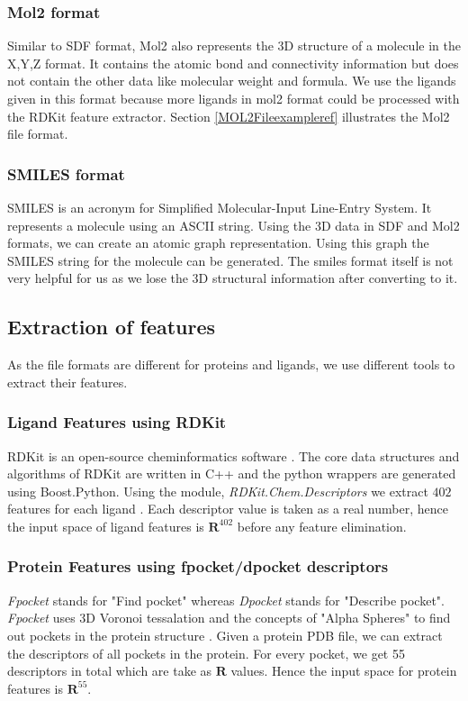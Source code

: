 \documentclass[11pt]{article}
\begin{document}
\subsubsection{Mol2 format}
Similar to SDF format,  Mol2 also represents the 3D structure of a molecule in the X,Y,Z format.
It contains the atomic bond and connectivity information but does not contain the other data like molecular weight and formula.
We use the ligands given in this format because more ligands in mol2 format could be processed with the RDKit feature extractor.
Section \ref{MOL2Fileexampleref} illustrates the Mol2 file format.

\subsubsection{SMILES format}
SMILES is an acronym for Simplified Molecular-Input Line-Entry System.
It represents a molecule using an ASCII string.
Using the 3D data in SDF and Mol2 formats,  we can create an atomic graph representation.
Using this graph the SMILES string for the molecule can be generated.
The smiles format itself is not very helpful for us as we lose the 3D structural information after converting to it.
\cite{smilesformat}

\subsection{Extraction of features}
As the file formats are different for proteins and ligands,  we use different tools to extract their features.
\subsubsection{Ligand Features using RDKit}
RDKit is an open-source cheminformatics software \cite{rdkitofficalpage}.
The core data structures and algorithms of RDKit are written in C++ and the
python wrappers are generated using Boost.Python.
Using the module, \textit{RDKit.Chem.Descriptors} we extract $402$ features for each ligand \cite{rdkitbioinformaticsfreiburg}.
Each descriptor value is taken as a real number,  hence the input space of ligand features is $\mathbf{R}^{402}$ before any feature elimination.

\subsubsection{Protein Features using fpocket/dpocket descriptors}
\textit{Fpocket} stands for "Find pocket" whereas \textit{Dpocket} stands for "Describe pocket".
\textit{Fpocket} uses 3D Voronoi tessalation and the concepts of "Alpha Spheres" to find out pockets in the protein structure \cite{fpocketmanual} \cite{voronoitesselationshortvideo}.
Given a protein PDB file, we can extract the descriptors of all pockets in the protein.
For every pocket, we get 55 descriptors in total which are take as $\mathbf{R}$ values.
Hence the input space for protein features is $\mathbf{R}^{55}$.
\end{document}

